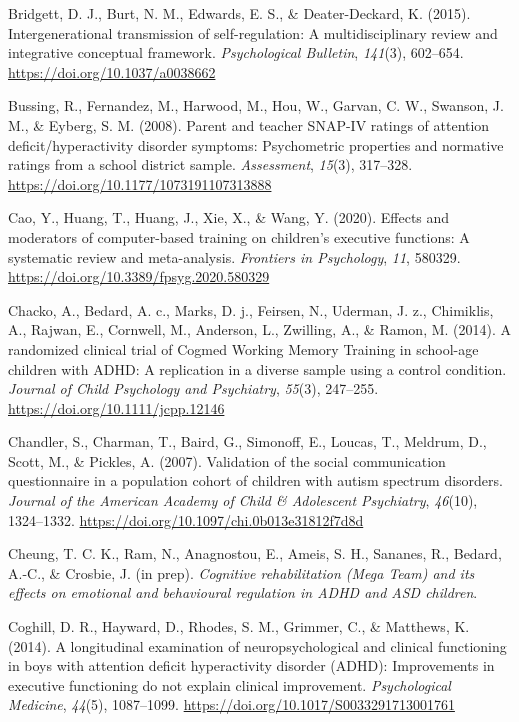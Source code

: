 \documentclass[
  letterpaper,
]{ut-thesis}
\newlength{\cslhangindent}
\newenvironment{CSLReferences}[2] %
 {\begin{list}{}{%
  \setlength{\itemindent}{0pt}
  \setlength{\leftmargin}{0pt}
  \setlength{\parsep}{0pt}
  \ifodd #1
   \setlength{\leftmargin}{\cslhangindent}
   \setlength{\itemindent}{-1\cslhangindent}
  \fi
  \setlength{\itemsep}{#2\baselineskip}}}
 {\end{list}}
\begin{document}
\begin{CSLReferences}{1}{0}
Bridgett, D. J., Burt, N. M., Edwards, E. S., \& Deater-Deckard, K.
(2015). Intergenerational transmission of self-regulation: A
multidisciplinary review and integrative conceptual framework.
\emph{Psychological Bulletin}, \emph{141}(3), 602--654.
\url{https://doi.org/10.1037/a0038662}

Bussing, R., Fernandez, M., Harwood, M., Hou, W., Garvan, C. W.,
Swanson, J. M., \& Eyberg, S. M. (2008). Parent and teacher {SNAP-IV}
ratings of attention deficit/hyperactivity disorder symptoms:
{Psychometric} properties and normative ratings from a school district
sample. \emph{Assessment}, \emph{15}(3), 317--328.
\url{https://doi.org/10.1177/1073191107313888}

Cao, Y., Huang, T., Huang, J., Xie, X., \& Wang, Y. (2020). Effects and
moderators of computer-based training on children's executive functions:
A systematic review and meta-analysis. \emph{Frontiers in Psychology},
\emph{11}, 580329. \url{https://doi.org/10.3389/fpsyg.2020.580329}

Chacko, A., Bedard, A. c., Marks, D. j., Feirsen, N., Uderman, J. z.,
Chimiklis, A., Rajwan, E., Cornwell, M., Anderson, L., Zwilling, A., \&
Ramon, M. (2014). A randomized clinical trial of {Cogmed Working Memory
Training} in school-age children with {ADHD}: A replication in a diverse
sample using a control condition. \emph{Journal of Child Psychology and
Psychiatry}, \emph{55}(3), 247--255.
\url{https://doi.org/10.1111/jcpp.12146}

Chandler, S., Charman, T., Baird, G., Simonoff, E., Loucas, T., Meldrum,
D., Scott, M., \& Pickles, A. (2007). Validation of the social
communication questionnaire in a population cohort of children with
autism spectrum disorders. \emph{Journal of the American Academy of
Child \& Adolescent Psychiatry}, \emph{46}(10), 1324--1332.
\url{https://doi.org/10.1097/chi.0b013e31812f7d8d}

Cheung, T. C. K., Ram, N., Anagnostou, E., Ameis, S. H., Sananes, R.,
Bedard, A.-C., \& Crosbie, J. (in prep). \emph{Cognitive rehabilitation
({Mega Team}) and its effects on emotional and behavioural regulation in
{ADHD} and {ASD} children}.

Coghill, D. R., Hayward, D., Rhodes, S. M., Grimmer, C., \& Matthews, K.
(2014). A longitudinal examination of neuropsychological and clinical
functioning in boys with attention deficit hyperactivity disorder
({ADHD}): Improvements in executive functioning do not explain clinical
improvement. \emph{Psychological Medicine}, \emph{44}(5), 1087--1099.
\url{https://doi.org/10.1017/S0033291713001761}


\end{CSLReferences}
\end{document}
